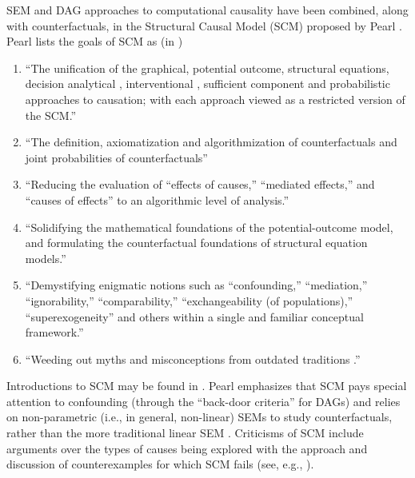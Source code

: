 SEM and DAG approaches to computational causality have been combined, along with counterfactuals, in the Structural Causal Model (SCM) proposed by Pearl \cite{Pearl2000,Pearl2009}.  Pearl lists the goals of SCM as (in \cite{Pearl2009})
\begin{enumerate}
\item ``The unification of the graphical, potential outcome, structural equations, decision analytical \cite{Dawid2002}, interventional \cite{Woodward2003}, sufficient component \cite{Rothman1976} and probabilistic \cite{Suppes1970} approaches to causation; with each approach viewed as a restricted version of the SCM.''
\item ``The definition, axiomatization and algorithmization of counterfactuals and joint probabilities of counterfactuals''
\item ``Reducing the evaluation of “effects of causes,” “mediated effects,” and “causes of effects” to an algorithmic level of analysis.''
\item ``Solidifying the mathematical foundations of the potential-outcome model, and formulating the counterfactual foundations of structural equation models.''
\item ``Demystifying enigmatic notions such as “confounding,” “mediation,” “ignorability,” “comparability,” “exchangeability (of populations),” “superexogeneity” and others within a single and familiar conceptual framework.''
\item ``Weeding out myths and misconceptions from outdated traditions \cite{Meek1994,Greenland1999,Cole2002,Arah2008,Shrier2009,Pearl2009l}.''
\end{enumerate}
Introductions to SCM may be found in \cite{Pearl2009,Pearl2000}.  Pearl emphasizes that SCM pays special attention to confounding (through the ``back-door criteria'' for DAGs) and relies on non-parametric (i.e., in general, non-linear) SEMs to study counterfactuals, rather than the more traditional linear SEM \cite{Pearl2009}.  Criticisms of SCM include arguments over the types of causes being explored with the approach and discussion of counterexamples for which SCM fails (see, e.g., \cite{Hall2007,Glymour2010,Menzies2004}).

